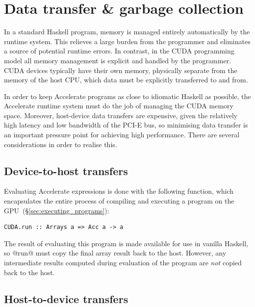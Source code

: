 \section{Data transfer \& garbage collection}
\label{sec:memory_management}

In a standard Haskell program, memory is managed entirely automatically by the
runtime system. This relieves a large burden from the programmer and eliminates
a source of potential runtime errors. In contrast, in the CUDA programming model
all memory management is explicit and handled by the programmer. CUDA devices
typically have their own memory, physically separate from the memory of the host
CPU, which data must be explicitly transferred to and from.

In order to keep Accelerate programs as close to idiomatic Haskell as possible,
the Accelerate runtime system must do the job of managing the CUDA memory
space. Moreover, host-device data transfers are expensive, given the relatively
high latency and low bandwidth of the PCI-E bus, so minimising data transfer is
an important pressure point for achieving high performance. There are several
considerations in order to realise this.



\subsection{Device-to-host transfers}

Evaluating Accelerate expressions is done with the following function, which
encapsulates the entire process of compiling and executing a program on the
GPU~(\S\ref{sec:executing_programs}):
%
\begin{lstlisting}[style=haskell,numbers=none]
CUDA.run :: Arrays a => Acc a -> a
\end{lstlisting}
%
The result of evaluating this program is made available for use in vanilla
Haskell, so @run@ must copy the final array result back to the host.
However, any intermediate results computed during evaluation of the program are
\emph{not} copied back to the host.


\subsection{Host-to-device transfers}
\label{sec:host_device_transfers}

